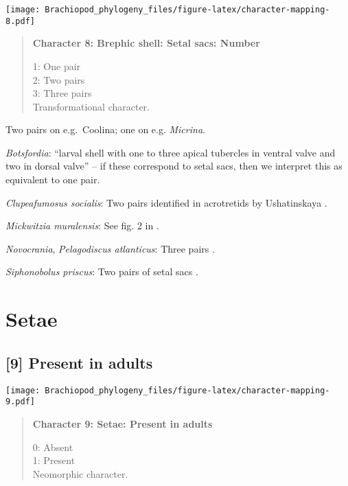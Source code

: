 \documentclass[openany]{book}
\theoremstyle{definition}
\theoremstyle{definition}
\theoremstyle{definition}
\theoremstyle{remark}
\begin{document}
\texttt{[image: Brachiopod\_phylogeny\_files/figure-latex/character-mapping-8.pdf]}

\begin{quote}
\textbf{Character 8: Brephic shell: Setal sacs: Number}

1: One pair\\
2: Two pairs\\
3: Three pairs\\
Transformational character.
\end{quote}

Two pairs on e.g.~Coolina; one on e.g. \emph{Micrina}.

\hypertarget{Botsfordia-coding-8}{}
\emph{Botsfordia}: ``larval shell with one to three apical tubercles in
ventral valve and two in dorsal valve''
\citep{Williams2000LinguliformeaCraniiformea} -- if these correspond to
setal sacs, then we interpret this as equivalent to one pair.

\hypertarget{Clupeafumosus_socialis-coding-8}{}
\emph{Clupeafumosus socialis}: Two pairs identified in acrotretids by
Ushatinskaya \citeyearpar{Ushatinskaya2016Protegulumand}.

\hypertarget{Mickwitzia_muralensis-coding-8}{}
\emph{Mickwitzia muralensis}: See fig. 2 in
\citet{Balthasar2009Thebrachiopod}.

\hypertarget{Novocrania-coding-8}{}
\emph{Novocrania}, \emph{Pelagodiscus atlanticus}: Three pairs
\citep{Carlson1995Phylogeneticrelationships}.

\hypertarget{Siphonobolus_priscus-coding-8}{}
\emph{Siphonobolus priscus}: Two pairs of setal sacs
\citep{Popov2009Earlyontogeny}.

\section{Setae}\label{setae}

\subsection*{{[}9{]} Present in adults}\label{present-in-adults}

\texttt{[image: Brachiopod\_phylogeny\_files/figure-latex/character-mapping-9.pdf]}

\begin{quote}
\textbf{Character 9: Setae: Present in adults}

0: Absent\\
1: Present\\
Neomorphic character.
\end{quote}
\end{document}
